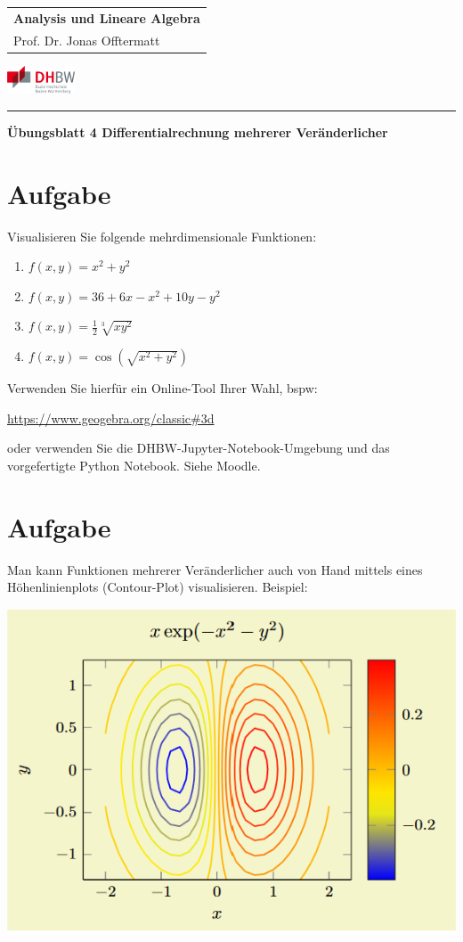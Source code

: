 \documentclass[fontsize=11pt, parskip=half]{scrartcl}
\begin{document}
\noindent
\begin{tabular}{l}
    \textbf{Analysis und Lineare Algebra} \\    
    Prof. Dr. Jonas Offtermatt
\end{tabular}
\hfill \includegraphics[width=2cm]{DHBW.pdf}\\
\rule{\textwidth}{0.5pt}


\begin{center}
    \Large
    \textbf{Übungsblatt 4 Differentialrechnung mehrerer Veränderlicher}
\end{center}
\section{Aufgabe}
Visualisieren Sie folgende mehrdimensionale Funktionen:
\begin{enumerate}[label=\alph*)]
    \item $f(x,y) = x^2 + y^2$
    \item $f(x,y) = 36 + 6x -x^2 + 10 y - y^2$
    \item $f(x,y) = \frac{1}{2}\sqrt[3]{x y^2}$
    \item $f(x,y) = \cos (\sqrt{x^2 + y^2})$
\end{enumerate}
Verwenden Sie hierfür ein Online-Tool Ihrer Wahl, bspw: 

\url{https://www.geogebra.org/classic#3d}

oder verwenden Sie die DHBW-Jupyter-Notebook-Umgebung und das vorgefertigte Python Notebook. Siehe Moodle.


\section{Aufgabe}
Man kann Funktionen mehrerer Veränderlicher auch von Hand mittels eines Höhenlinienplots (Contour-Plot) visualisieren. 
Beispiel:

\includegraphics{countourplot.png}
\end{document}
